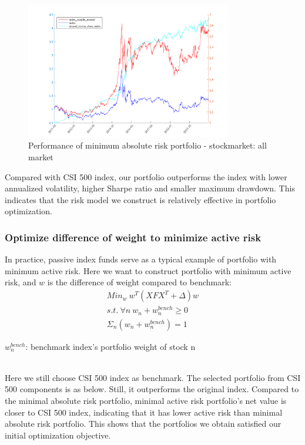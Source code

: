 \documentclass[10pt]{article}
\begin{document}
\begin{figure}[H]
    \centering
     \includegraphics[width=0.8\textwidth]{outside_neutral_than_index.png}
    \caption{Performance of minimum absolute risk portfolio - stockmarket: all market}
    \label{fig:Fig3}
\end{figure}

Compared with CSI 500 index, our portfolio outperforms the index with lower annualized volatility, higher Sharpe ratio and smaller maximum drawdown. This indicates that the risk model we construct is relatively effective in portfolio optimization.

\subsubsection{Optimize difference of weight to minimize active risk}
In practice, passive index funds serve as a typical example of portfolio with minimum active risk. Here we want to construct portfolio with minimum active risk, and $w$ is the difference of weight compared to benchmark:
\begin{equation}
\begin{split}
    Min_w\ w^T(XFX^T+\Delta)w\\s.t.\ \forall n\ w_n+w^{bench}_n\ge0\\\Sigma_n(w_n+w^{bench}_n)=1
\end{split}
\end{equation}
\centerline{$w^{bench}_n$: benchmark index's portfolio weight of stock n}
~\\

Here we still choose CSI 500 index as benchmark. The selected portfolio from CSI 500 components is as below. Still, it outperforms the original index. Compared to the minimal absolute risk portfolio, minimal active risk portfolio's net value is closer to CSI 500 index, indicating that it has lower active risk than minimal absolute risk portfolio. This shows that the portfolios we obtain satisfied our initial optimization objective.
\end{document}
